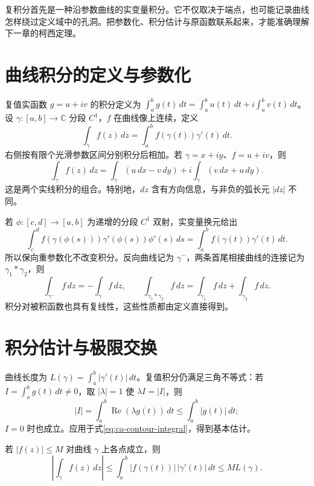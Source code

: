 \documentclass[UTF8,12pt,a4paper,fontset=fandol]{ctexbook}
\begin{document}
复积分首先是一种沿参数曲线的实变量积分。它不仅取决于端点，也可能记录曲线怎样绕过定义域中的孔洞。把参数化、积分估计与原函数联系起来，才能准确理解下一章的柯西定理。

\section{曲线积分的定义与参数化}

复值实函数 $g=u+iv$ 的积分定义为 $\int_a^b g(t)\,dt=\int_a^b u(t)\,dt+i\int_a^b v(t)\,dt$。设 $\gamma:[a,b]\to\mathbb{C}$ 分段 $C^1$，$f$ 在曲线像上连续，定义
\begin{equation}
  \int_\gamma f(z)\,dz=\int_a^b f(\gamma(t))\gamma'(t)\,dt.
  \label{eq:ca-contour-integral}
\end{equation}
右侧按有限个光滑参数区间分别积分后相加。若 $\gamma=x+iy$、$f=u+iv$，则
\[
 \int_\gamma f(z)\,dz=\int_\gamma(u\,dx-v\,dy)
                  +i\int_\gamma(v\,dx+u\,dy).
\]
这是两个实线积分的组合。特别地，$dz$ 含有方向信息，与非负的弧长元 $|dz|$ 不同。

若 $\phi:[c,d]\to[a,b]$ 为递增的分段 $C^1$ 双射，实变量换元给出
\[
 \int_c^d f(\gamma(\phi(s)))\gamma'(\phi(s))\phi'(s)\,ds
 =\int_a^b f(\gamma(t))\gamma'(t)\,dt.
\]
所以保向重参数化不改变积分。反向曲线记为 $\gamma^{-}$，两条首尾相接曲线的连接记为 $\gamma_1*\gamma_2$，则
\[
 \int_{\gamma^{-}}f\,dz=-\int_\gamma f\,dz,\qquad
 \int_{\gamma_1*\gamma_2}f\,dz=\int_{\gamma_1}f\,dz+\int_{\gamma_2}f\,dz.
\]
积分对被积函数也具有复线性，这些性质都由定义直接得到。

\section{积分估计与极限交换}

曲线长度为 $L(\gamma)=\int_a^b|\gamma'(t)|\,dt$。复值积分仍满足三角不等式：若 $I=\int_a^b g(t)\,dt\ne0$，取 $|\lambda|=1$ 使 $\lambda I=|I|$，则
\[
 |I|=\int_a^b\operatorname{Re}(\lambda g(t))\,dt\le\int_a^b|g(t)|\,dt;
\]
$I=0$ 时也成立。应用于式\eqref{eq:ca-contour-integral}，得到基本估计。

\begin{proposition}[$ML$ 估计]
\label{prop:ca-ml}
若 $|f(z)|\le M$ 对曲线 $\gamma$ 上各点成立，则
\begin{equation}
 \left|\int_\gamma f(z)\,dz\right|
 \le\int_a^b|f(\gamma(t))|\,|\gamma'(t)|\,dt\le ML(\gamma).
 \label{eq:ca-ml}
\end{equation}
\end{proposition}
\end{document}

